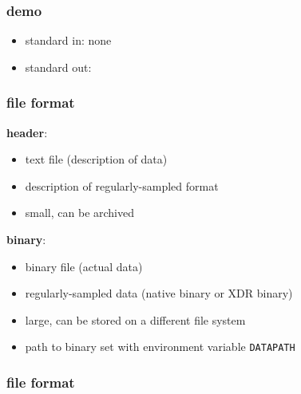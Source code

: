 \begin{frame}[fragile] \frametitle{demo}


  \vfill
  \begin{itemize}
  \item standard in: none
  \item standard out: 
  \end{itemize}

\end{frame}
\cwpnote{}

\begin{frame} \frametitle{file format}

  \textbf{header}:
  \begin{itemize}
  \item text file (description of data)
  \item description of regularly-sampled format
  \item small, can be archived
  \end{itemize}

  \textbf{binary}:
  \begin{itemize}
  \item binary file (actual data)
  \item regularly-sampled data (native binary or XDR binary)
  \item large, can be stored on a different file system
  \item path to binary set with environment variable \texttt{DATAPATH}
  \end{itemize}

\end{frame}
\cwpnote{}


\begin{frame} \frametitle{file format}
\end{frame}
\cwpnote{}

